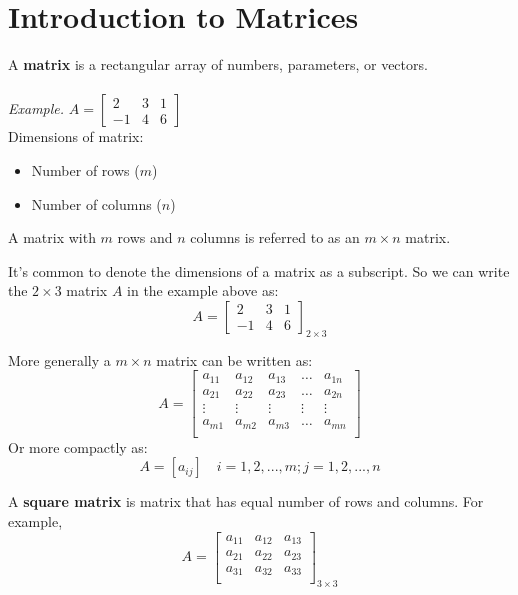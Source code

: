 \documentclass{./../Latex/handout}
\begin{document}
\thispagestyle{plain}

\section{Introduction to Matrices}
A \textbf{matrix} is a rectangular array of numbers, parameters, or vectors. \\~\\
\textit{Example.} $A = \begin{bmatrix}
2 & 3 & 1 \\
-1 &4 & 6
\end{bmatrix}$ \\

Dimensions of matrix:
\begin{itemize}
\item Number of rows ($m$)
\item Number of columns ($n$)
\end{itemize}
A matrix with $m$ rows and $n$ columns is referred to as an $m \times n$ matrix. 

It's common to denote the dimensions of a matrix as a subscript. So we can write the $ 2 \times 3$ matrix $A$ in the example above as:
  $$A = \begin{bmatrix}
2 & 3 & 1 \\
-1 &4 & 6
\end{bmatrix}_{2 \times 3}$$

More generally a $m \times n$ matrix can be written as:
$$A = \begin{bmatrix}
a_{11} & a_{12} & a_{13} & \hdots & a_{1n} \\
a_{21} & a_{22} & a_{23} & \hdots & a_{2n} \\
\vdots & \vdots & \vdots & \vdots & \vdots \\
a_{m1} & a_{m2} & a_{m3} & \hdots & a_{mn} \\
\end{bmatrix}$$
Or more compactly as:
$$ A = [ a_{ij} ] \quad i=1,2,...,m; j=1,2,...,n$$ 

A \textbf{square matrix} is matrix that has equal number of rows and columns. For example,
$$A = \begin{bmatrix}
a_{11} & a_{12} & a_{13} \\
a_{21} & a_{22} & a_{23} \\
a_{31} & a_{32} & a_{33} \\
\end{bmatrix}_{3\times 3}$$
\end{document}
